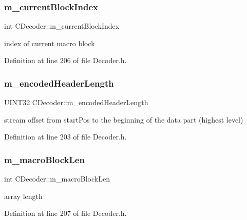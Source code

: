 \subsubsection{\texorpdfstring{m\_currentBlockIndex}{m\_currentBlockIndex}}
{\footnotesize\ttfamily int C\+Decoder\+::m\+\_\+current\+Block\+Index\hspace{0.3cm}{\ttfamily [private]}}



index of current macro block 



Definition at line 206 of file Decoder.\+h.

\mbox{\label{classCDecoder_aa59513d248af5c39dee8ae193876552b}} 
\subsubsection{\texorpdfstring{m\_encodedHeaderLength}{m\_encodedHeaderLength}}
{\footnotesize\ttfamily U\+I\+N\+T32 C\+Decoder\+::m\+\_\+encoded\+Header\+Length\hspace{0.3cm}{\ttfamily [private]}}



stream offset from start\+Pos to the beginning of the data part (highest level) 



Definition at line 203 of file Decoder.\+h.

\mbox{\label{classCDecoder_a215b9e3cd0bc08c1c67674f28247e63c}} 
\subsubsection{\texorpdfstring{m\_macroBlockLen}{m\_macroBlockLen}}
{\footnotesize\ttfamily int C\+Decoder\+::m\+\_\+macro\+Block\+Len\hspace{0.3cm}{\ttfamily [private]}}



array length 



Definition at line 207 of file Decoder.\+h.

\mbox{\label{classCDecoder_a7acf80ff3cb6193afed753a44a8d08fa}} 
